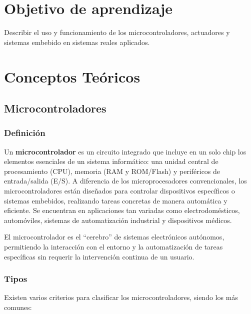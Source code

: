 \documentclass[a4paper,12pt]{article}
\begin{document}
	\tableofcontents
	
	\newpage
	\section{Objetivo de aprendizaje}
	Describir el uso y funcionamiento de los microcontroladores, actuadores y sistemas embebido en sistemas reales aplicados.
	
	\section{Conceptos Teóricos}
	
	\subsection{Microcontroladores}
	\subsubsection{Definición}
	Un \textbf{microcontrolador} es un circuito integrado que incluye en un solo chip los elementos esenciales de un sistema informático: una unidad central de procesamiento (CPU), memoria (RAM y ROM/Flash) y periféricos de entrada/salida (E/S). A diferencia de los microprocesadores convencionales, los microcontroladores están diseñados para controlar dispositivos específicos o sistemas embebidos, realizando tareas concretas de manera automática y eficiente. Se encuentran en aplicaciones tan variadas como electrodomésticos, automóviles, sistemas de automatización industrial y dispositivos médicos.
	
	El microcontrolador es el “cerebro” de sistemas electrónicos autónomos, permitiendo la interacción con el entorno y la automatización de tareas específicas sin requerir la intervención continua de un usuario.
	
	\subsubsection{Tipos}
	Existen varios criterios para clasificar los microcontroladores, siendo los más comunes:
	
\end{document}
